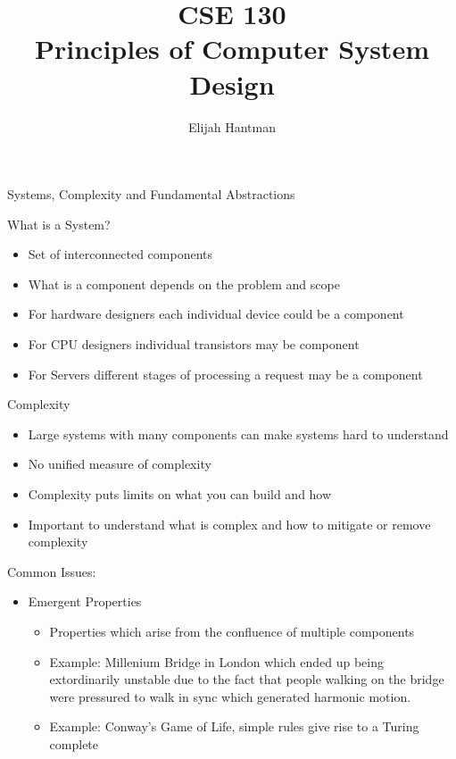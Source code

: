 \documentclass{report}
\title{\Huge{CSE 130}\\\huge{Principles of Computer System Design}}
\author{\huge{Elijah Hantman}}
\date{}
\begin{document}
\maketitle
\newpage

\large{Systems, Complexity and Fundamental Abstractions}
\begin{description}
    \item What is a System?
        \begin{itemize}
            \item Set of interconnected components
            \item What is a component depends on the problem and scope
            \item For hardware designers each individual device could be a component
            \item For CPU designers individual transistors may be component
            \item For Servers different stages of processing a request may be a component
        \end{itemize}
    \item Complexity
        \begin{itemize}
            \item Large systems with many components can make systems
                hard to understand
            \item No unified measure of complexity
            \item Complexity puts limits on what you can build and how
            \item Important to understand what is complex and how to
                mitigate or remove complexity
        \end{itemize}
    \item Common Issues:
        \begin{itemize}
            \item Emergent Properties
                \begin{itemize}
                    \item Properties which arise from the confluence of multiple components
                    \item Example: Millenium Bridge in London which ended up being extordinarily
                        unstable due to the fact that people walking on the bridge were pressured
                        to walk in sync which generated harmonic motion.
                    \item Example: Conway's Game of Life, simple rules give rise to a Turing complete

\end{itemize}
\end{itemize}
\end{description}
\end{document}
